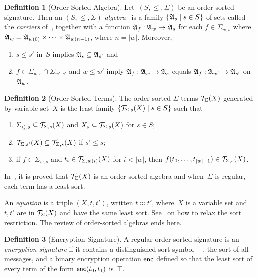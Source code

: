 \documentclass[12pt]{article}
\theoremstyle{definition}
\newtheorem{defn}{Definition}[section]
\begin{document}
\begin{defn}[Order-Sorted Algebra]
Let~$(S,\leq,\Sigma)$ be an order-sorted signature.  Then an
$(S,\leq,\Sigma)$-\emph{algebra}~ is a family $\{\mathfrak A_s\mid
s\in S\}$ of sets called the \emph{carriers} of~, together with
a function $\mathfrak A_f:\mathfrak A_w\to\mathfrak A_s$ for each
$f\in\Sigma_{w,s}$ where $\mathfrak A_w=\mathfrak A_{w(0)}\times\cdots\times
\mathfrak A_{w(n-1)}$, where $n=|w|$.  Moreover,
\begin{enumerate}
\item $s\leq s'$ in~$S$ implies $\mathfrak A_s\subseteq\mathfrak A_{s'}$ and
\item $f\in\Sigma_{w,s}\cap\Sigma_{w',s'}$ and $w\leq
  w'$ imply $\mathfrak A_f:\mathfrak A_{w}\to\mathfrak A_{s}$ equals
  $\mathfrak A_f:\mathfrak A_{w'}\to\mathfrak A_{s'}$ on $\mathfrak A_{w}$.
\end{enumerate}
\end{defn}

\begin{defn}[Order-Sorted Terms]
The order-sorted $\Sigma$-terms $\mathcal{T}_\Sigma(X)$ generated by
variable set~$X$ is the least family $\{\mathcal{T}_{\Sigma,s}(X)\mid
s\in S\}$ such that
\begin{enumerate}
\item $\Sigma_{\langle\rangle,s}\subseteq\mathcal{T}_{\Sigma,s}(X)$
and $X_s\subseteq\mathcal{T}_{\Sigma,s}(X)$ for $s\in S$;
\item $\mathcal{T}_{\Sigma,s'}(X)\subseteq\mathcal{T}_{\Sigma,s}(X)$
  if $s'\leq s$;
\item if $f\in\Sigma_{w,s}$ and $t_i\in\mathcal{T}_{\Sigma,w(i)}(X)$
  for $i<|w|$, then $f(t_0,\ldots,t_{|w|-1})\in
  \mathcal{T}_{\Sigma,s}(X)$.
\end{enumerate}
\end{defn}

In~\cite{GoguenMeseguer92}, it is proved that $\mathcal{T}_\Sigma(X)$
is an order-sorted algebra and when~$\Sigma$ is regular, each term has
a least sort.

An \emph{equation} is a triple $(X,t,t')$, written $t\approx t'$,
where~$X$ is a variable set and $t,t'$ are in $\mathcal{T}_\Sigma(X)$ and
have the same least sort.  See~\cite{GoguenMeseguer92} on how to relax
the sort restriction.  The review of order-sorted algebras ends here.

\begin{defn}[Encryption Signature]
A regular order-sorted signature is an \emph{encryption signature} if
it contains a distinguished sort symbol~$\top$, the sort of all
messages, and a binary encryption operation $\operatorname{\mathsf{enc}}$ defined so that
the least sort of every term of the form $\operatorname{\mathsf{enc}}(t_0,t_1)$
is~$\top$.
\end{defn}
\end{document}
